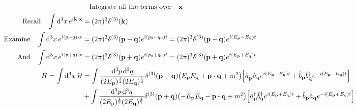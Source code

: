 \documentclass{article}
\begin{document}
\begin{align*}
                                                     & \qq{Integrate all the terms over}\vb{x}                                                                                                                                                                                                                                                                                 \\
    \qq*{Recall}\int \dd[3]{x}e^{i\vb{k}\vdot\vb{x}} & =(2\pi)^3 \delta^{(3)}(\vb{k})                                                                                                                                                                                                                                                                                          \\
    \qq*{Examine}\int \dd[3]{x}e^{i(p-q)\vdot x}     & =(2\pi)^3 \delta^{(3)}(\vb{p}-\vb{q})e^{i(p_0-q_0)t}=(2\pi)^3  \delta^{(3)}(\vb{p}-\vb{q})e^{i(E_{\vb{p}}-E_{\vb{q}})t}                                                                                                                                                                                                 \\
    \qq*{And}\int \dd[3]{x}e^{i(p+q)\vdot x}         & =(2\pi)^3 \delta^{(3)}(\vb{p}+\vb{q})e^{i(p_0+q_0)t}=(2\pi)^3  \delta^{(3)}(\vb{p}+\vb{q})e^{i(E_{\vb{p}}+E_{\vb{q}})t}                                                                                                                                                                                                 \\
    \hat{H}=\int\dd[3]{x}\mathcal{H}                 & =\int \frac{\dd[3]{p}\dd[3]{q}}{(2E_{\vb{p}})^{\frac{1}{2}}(2E_{\vb{q}})^{\frac{1}{2}}}\delta^{(3)}(\vb{p}-\vb{q})\pqty{E_{\vb{p}}E_{\vb{q}}+\vb{p}\vdot\vb{q}+m^2}\bqty{\hat{a}^\dagger_{\vb{p}}\hat{a}_{\vb{q}}e^{i(E_{\vb{p}}-E_{\vb{q}})t}+\hat{b}_{\vb{p}}\hat{b}^\dagger_{\vb{q}}e^{-i(E_{\vb{p}}-E_{\vb{q}})t}}  \\
                                                     & +\int \frac{\dd[3]{p}\dd[3]{q}}{(2E_{\vb{p}})^{\frac{1}{2}}(2E_{\vb{q}})^{\frac{1}{2}}}\delta^{(3)}(\vb{p}+\vb{q})\pqty{-E_{\vb{p}}E_{\vb{q}}-\vb{p}\vdot\vb{q}+m^2}\bqty{\hat{a}^\dagger_{\vb{p}}\hat{b}^\dagger_{\vb{q}}e^{i(E_{\vb{p}}+E_{\vb{q}})t}+\hat{b}_{\vb{p}}\hat{a}_{\vb{q}}e^{-i(E_{\vb{p}}+E_{\vb{q}})t}} \\
\end{align*}
\end{document}
